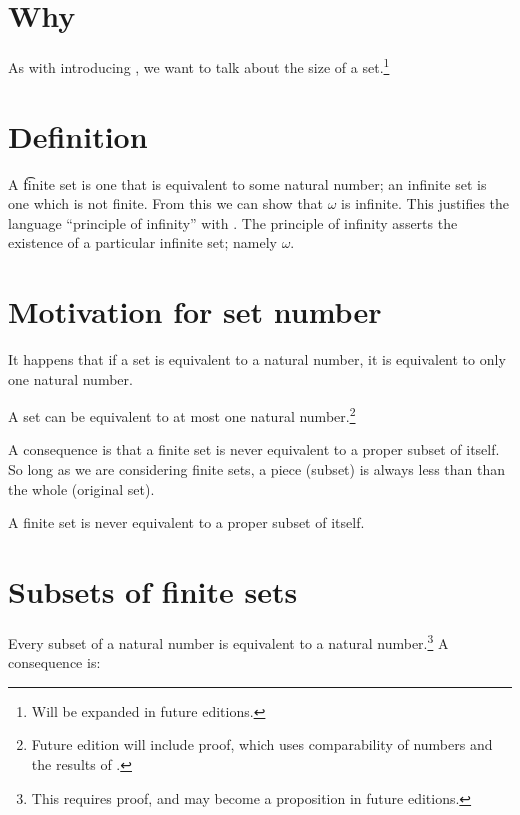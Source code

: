 
\section*{Why}

As with introducing , we want to talk about the size of a set.\footnote{Will be expanded in future editions.}

\section*{Definition}

A \t{finite} set is one that is equivalent to some natural number; an infinite set is one which is not finite.
From this we can show that $\omega $ is infinite.
This justifies the language ``principle of infinity'' with .
The principle of infinity asserts the existence of a particular infinite set; namely $\omega $.

\section*{Motivation for set number}

It happens that if a set is equivalent to a natural number, it is equivalent to only one natural number.

\begin{proposition}
A set can be equivalent to at most one natural number.\footnote{Future edition will include proof, which uses comparability of numbers and the results of .}
\end{proposition}

A consequence is that a finite set is never equivalent to a proper subset of itself.
So long as we are considering finite sets, a piece (subset) is always less than than the whole (original set).

\begin{proposition}
A finite set is never equivalent to a proper subset of itself.
\end{proposition}

\section*{Subsets of finite sets}

Every subset of a natural number is equivalent to a natural number.\footnote{This requires proof, and may become a proposition in future editions.}
A consequence is:

